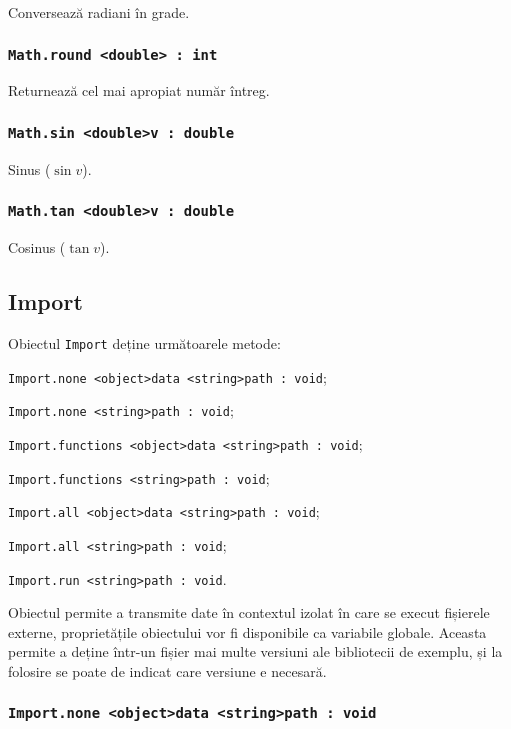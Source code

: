 Conversează radiani în grade.

\subsubsection{\lstinline|Math.round <double> : int|}

Returnează cel mai apropiat număr întreg.

\subsubsection{\lstinline|Math.sin <double>v : double|}

Sinus ($\sin{v}$).

\subsubsection{\lstinline|Math.tan <double>v : double|}

Cosinus ($\tan{v}$).

\subsection{{\color{orange} Import}}

Obiectul \lstinline|Import| deține următoarele metode:
\begin{icItems}
	\item \lstinline|Import.none <object>data <string>path : void|;
	\item \lstinline|Import.none <string>path : void|;
	\item \lstinline|Import.functions <object>data <string>path : void|;
	\item \lstinline|Import.functions <string>path : void|;
	\item \lstinline|Import.all <object>data <string>path : void|;
	\item \lstinline|Import.all <string>path : void|;
	\item \lstinline|Import.run <string>path : void|.
\end{icItems}

Obiectul  permite a transmite date în contextul izolat în care se execut fișierele externe, proprietățile obiectului  vor fi disponibile ca variabile globale. Aceasta permite a deține într-un fișier mai multe versiuni ale bibliotecii de exemplu, și la folosire se poate de indicat care versiune e necesară.

\subsubsection{\lstinline|Import.none <object>data <string>path : void|}

